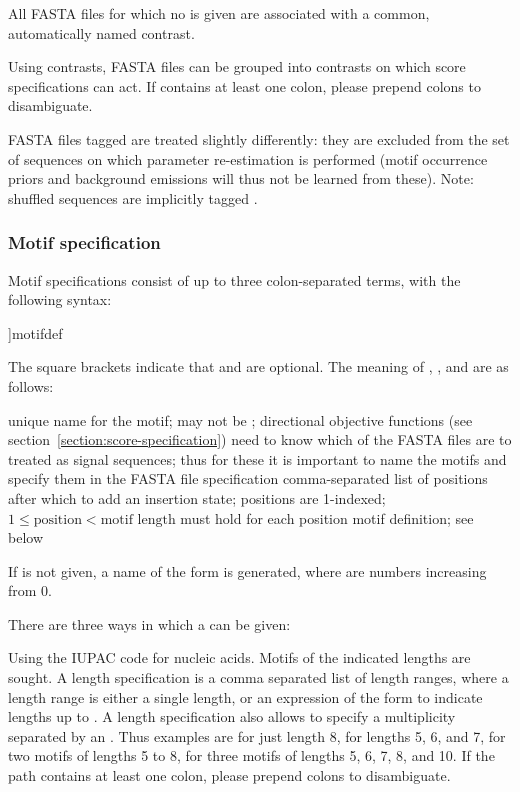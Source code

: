 \documentclass[a4paper]{article}
\begin{document}
All FASTA files for which no  is given are associated with a common, automatically named contrast.

Using contrasts, FASTA files can be grouped into contrasts on which score specifications can act.
If  contains at least one colon, please prepend colons to disambiguate.

FASTA files tagged  are treated slightly differently:
they are excluded from the set of sequences on which parameter re-estimation is performed (motif occurrence priors and background emissions will thus not be learned from these).
Note: shuffled sequences are implicitly tagged .

\subsubsection{Motif specification}
\label{section:motif-specification}
Motif specifications consist of up to three colon-separated terms, with the following syntax:

\begin{verbbox}
[name:[insert:]]motifdef
\end{verbbox}
\fbox{\theverbbox[t]}

The square brackets indicate that  and  are optional.
The meaning of , , and  are as follows:

\begin{description}
  unique name for the motif; may not be ;
  directional objective functions (see section~\ref{section:score-specification}) need to know which of the FASTA files are to treated as signal sequences;
  thus for these it is important to name the motifs and specify them in the FASTA file specification
    comma-separated list of positions after which to add an insertion state; positions are 1-indexed; $1 \leq \text{position} < \text{motif length}$ must hold for each position
    motif definition; see below
\end{description}

If  is not given, a name of the form  is generated, where  are numbers increasing from 0.

There are three ways in which a  can be given:

\begin{description}
    Using the IUPAC code for nucleic acids.
    Motifs of the indicated lengths are sought.
    A length specification is a comma separated list of length ranges, where a length range is either a single length, or an expression of the form  to indicate lengths  up to .
    A length specification also allows to specify a multiplicity separated by an .
    Thus examples are  for just length 8,  for lengths 5, 6, and 7,  for two motifs of lengths 5 to 8,  for three motifs of lengths 5, 6, 7, 8, and 10.
    If the path contains at least one colon, please prepend colons to disambiguate.
\end{description}
\end{document}

